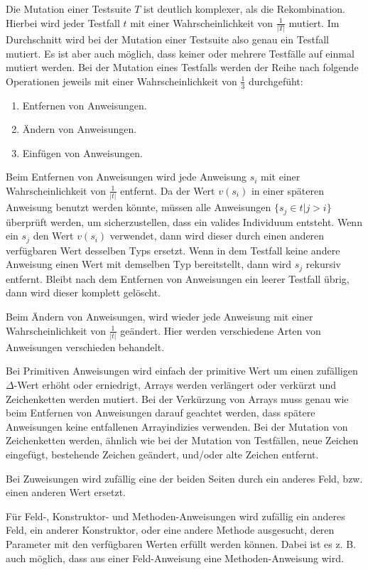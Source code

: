 \documentclass[a4paper,11pt]{article}
\begin{document}
Die Mutation einer Testsuite $T$ ist deutlich komplexer, als die Rekombination.
Hierbei wird jeder Testfall $t$ mit einer Wahrscheinlichkeit von $\frac{1}{|T|}$ mutiert.
Im Durchschnitt wird bei der Mutation einer Testsuite also genau ein Testfall mutiert.
Es ist aber auch möglich, dass keiner oder mehrere Testfälle auf einmal mutiert werden. Bei der Mutation eines Testfalls werden der Reihe nach folgende Operationen jeweils mit einer Wahrscheinlichkeit von $\frac{1}{3}$ durchgefüht:
\begin{enumerate}
	\item Entfernen von Anweisungen.
	\item Ändern von Anweisungen.
	\item Einfügen von Anweisungen.
\end{enumerate}

Beim Entfernen von Anweisungen wird jede Anweisung $s_i$ mit einer Wahrscheinlichkeit von $\frac{1}{|t|}$ entfernt.
Da der Wert $v(s_i)$ in einer späteren Anweisung benutzt werden könnte, müssen alle Anweisungen $\{s_j \in t | j > i\}$ überprüft werden, um sicherzustellen, dass ein valides Individuum entsteht.
Wenn ein $s_j$ den Wert $v(s_i)$ verwendet, dann wird dieser durch einen anderen verfügbaren Wert desselben Typs ersetzt.
Wenn in dem Testfall keine andere Anweisung einen Wert mit demselben Typ bereitstellt, dann wird $s_j$ rekursiv entfernt.
Bleibt nach dem Entfernen von Anweisungen ein leerer Testfall übrig, dann wird dieser komplett gelöscht.

Beim Ändern von Anweisungen, wird wieder jede Anweisung mit einer Wahrscheinlichkeit von $\frac{1}{|t|}$ geändert.
Hier werden verschiedene Arten von Anweisungen verschieden behandelt.

Bei Primitiven Anweisungen wird einfach der primitive Wert um einen zufälligen $\Delta$-Wert erhöht oder erniedrigt, Arrays werden verlängert oder verkürzt und Zeichenketten werden mutiert.
Bei der Verkürzung von Arrays muss genau wie beim Entfernen von Anweisungen darauf geachtet werden, dass spätere Anweisungen keine entfallenen Arrayindizies verwenden.
Bei der Mutation von Zeichenketten werden, ähnlich wie bei der Mutation von Testfällen, neue Zeichen eingefügt, bestehende Zeichen geändert, und/oder alte Zeichen entfernt.

Bei Zuweisungen wird zufällig eine der beiden Seiten durch ein anderes Feld, bzw. einen anderen Wert ersetzt.

Für Feld-, Konstruktor- und Methoden-Anweisungen wird zufällig ein anderes Feld, ein anderer Konstruktor, oder eine andere Methode ausgesucht, deren Parameter mit den verfügbaren Werten erfüllt werden können.
Dabei ist es z. B. auch möglich, dass aus einer Feld-Anweisung eine Methoden-Anweisung wird.
\end{document}
